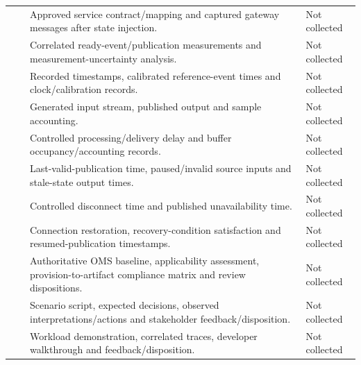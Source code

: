 \begin{tabularx}{\linewidth}{L{2.6cm}L{2.7cm}YL{2.1cm}}
\label{PlannedEvidence:VER-019} &  & Approved service contract/mapping and captured gateway messages after state injection. & Not collected\\
\label{PlannedEvidence:VER-020} &  & Correlated ready-event/publication measurements and measurement-uncertainty analysis. & Not collected\\
\label{PlannedEvidence:VER-021} &  & Recorded timestamps, calibrated reference-event times and clock/calibration records. & Not collected\\
\label{PlannedEvidence:VER-022} &  & Generated input stream, published output and sample accounting. & Not collected\\
\label{PlannedEvidence:VER-023} &  & Controlled processing/delivery delay and buffer occupancy/accounting records. & Not collected\\
\label{PlannedEvidence:VER-024} &  & Last-valid-publication time, paused/invalid source inputs and stale-state output times. & Not collected\\
\label{PlannedEvidence:VER-025} &  & Controlled disconnect time and published unavailability time. & Not collected\\
\label{PlannedEvidence:VER-026} &  & Connection restoration, recovery-condition satisfaction and resumed-publication timestamps. & Not collected\\
\label{PlannedEvidence:VER-027} &  & Authoritative OMS baseline, applicability assessment, provision-to-artifact compliance matrix and review dispositions. & Not collected\\
\label{PlannedEvidence:VAL-004} &  & Scenario script, expected decisions, observed interpretations/actions and stakeholder feedback/disposition. & Not collected\\
\label{PlannedEvidence:VAL-005} &  & Workload demonstration, correlated traces, developer walkthrough and feedback/disposition. & Not collected\\

\end{tabularx}
